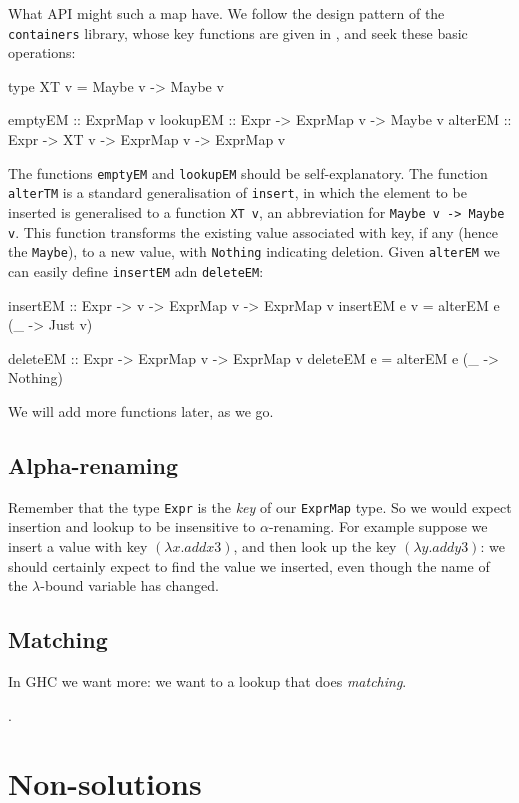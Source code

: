 \documentclass[format=sigplan]{acmart}
\theoremstyle{theorem}
\theoremstyle{definition}
\theoremstyle{remark}
\begin{document}
What API might such a map have. We follow the design pattern of
the \lstinline{containers} library, whose key functions are given in ,
and seek these basic operations:
\begin{code}
  type XT v = Maybe v -> Maybe v

  emptyEM  :: ExprMap v
  lookupEM :: Expr -> ExprMap v -> Maybe v
  alterEM  :: Expr -> XT v -> ExprMap v -> ExprMap v
\end{code}
The functions \lstinline{emptyEM} and \lstinline{lookupEM} should be
self-explanatory.  The function \lstinline{alterTM} is a standard
generalisation of \lstinline{insert}, in which the element to be
inserted is generalised to a function \lstinline{XT v}, an
abbreviation for \lstinline{Maybe v -> Maybe v}.  This function
transforms the existing value associated with key, if any (hence the
\lstinline{Maybe}), to a new value, with \lstinline{Nothing}
indicating deletion.  Given \lstinline{alterEM} we can easily define \lstinline{insertEM} adn \lstinline{deleteEM}:
\begin{code}
  insertEM :: Expr -> v -> ExprMap v -> ExprMap v
  insertEM e v = alterEM e (\_ -> Just v)

  deleteEM :: Expr -> ExprMap v -> ExprMap v
  deleteEM e = alterEM e (\_ -> Nothing)
\end{code}
We will add more functions later, as we go.

\subsection{Alpha-renaming}

Remember that the type \lstinline{Expr} is the \emph{key} of our \lstinline{ExprMap} type.
So we would expect insertion and lookup to be insensitive to
$\alpha$-renaming. For example suppose we insert a value with key
$(\lambda x. add x 3)$, and then look up the
key $(\lambda y. add y 3)$: we should
certainly expect to find the value we inserted, even though the name
of the $\lambda$-bound variable has changed.


\subsection{Matching}
In GHC we want more: we want to a lookup that does \emph{matching}.

.

\section{Non-solutions} \label{sec:ord}
\end{document}
